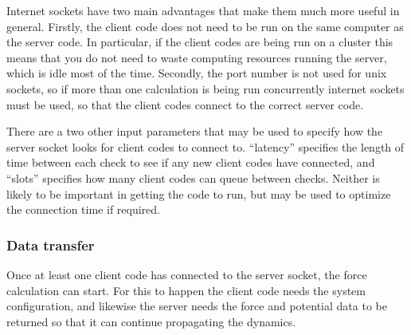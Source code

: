 \documentclass[11pt,english,fleqn]{report}
\begin{document}
Internet sockets have two main advantages that make them much more
useful in general. Firstly, the client code does not need to be run
on the same computer as the server code. In particular, if the client
codes are being run on a cluster this means that you do not need to
waste computing resources running the server, which is idle most of
the time. Secondly, the port number is not used for unix sockets,
so if more than one calculation is being run concurrently internet
sockets must be used, so that the client codes connect to the correct
server code.

There are a two other input parameters that may be used to specify
how the server socket looks for client codes to connect to. {}``latency''
specifies the length of time between each check to see if any new
client codes have connected, and {}``slots'' specifies how many
client codes can queue between checks. Neither is likely to be important
in getting the code to run, but may be used to optimize the connection
time if required.


\subsubsection{Data transfer}

Once at least one client code has connected to the server socket,
the force calculation can start. For this to happen the client code
needs the system configuration, and likewise the server needs the
force and potential data to be returned so that it can continue propagating
the dynamics.
\end{document}
